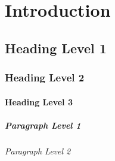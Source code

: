 \cleardoublepage
\chapter{Introduction}
\label{chap:1} %


\section{Heading Level 1}

\subsection{Heading Level 2}

\subsubsection{Heading Level 3}

\paragraph{Paragraph Level 1}

\subparagraph{Paragraph Level 2}
